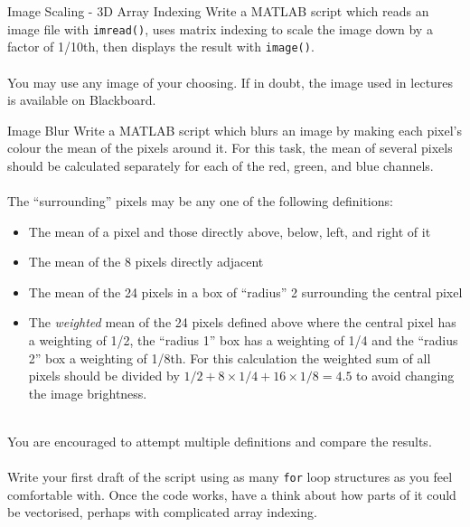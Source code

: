 \documentclass{lab}
\begin{document}
\begin{task}{Image Scaling - 3D Array Indexing}{}
Write a MATLAB script which reads an image file with \texttt{imread()}, uses matrix indexing to scale the image down by a factor of 1/10th, then displays the result with \texttt{image()}.
\\~\\
You may use any image of your choosing. If in doubt, the image used in lectures is available on Blackboard.
\end{task}

\pagebreak

\begin{task}{Image Blur}{}
Write a MATLAB script which blurs an image by making each pixel's colour the mean of the pixels around it. For this task, the mean of several pixels should be calculated separately for each of the red, green, and blue channels.
\\~\\
The ``surrounding'' pixels may be any one of the following definitions:
\begin{itemize}
	\item The mean of a pixel and those directly above, below, left, and right of it
	\item The mean of the 8 pixels directly adjacent
	\item The mean of the 24 pixels  in a box of ``radius'' 2 surrounding the central pixel
	\item The \textit{weighted} mean of the 24 pixels defined above where the central pixel has a weighting of 1/2, the ``radius 1'' box has a weighting of 1/4 and the ``radius 2'' box a weighting of 1/8th. For this calculation the weighted sum of all pixels should be divided by $1/2+8\times1/4+16\times1/8 = 4.5$ to avoid changing the image brightness.
\end{itemize}
~\\
You are encouraged to attempt multiple definitions and compare the results.
\\~\\
Write your first draft of the script using as many \texttt{for} loop structures as you feel comfortable with. Once the code works, have a think about how parts of it could be vectorised, perhaps with complicated array indexing.
\end{task}
\end{document}
